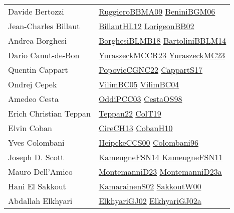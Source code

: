 {\begin{longtable}{p{4cm}p{20cm}}
Davide Bertozzi & \href{articles/RuggieroBBMA09.pdf}{RuggieroBBMA09}\cite{RuggieroBBMA09} \href{papers/BeniniBGM06.pdf}{BeniniBGM06}\cite{BeniniBGM06} \\
Jean{-}Charles Billaut & \href{papers/BillautHL12.pdf}{BillautHL12}\cite{BillautHL12} \href{}{LorigeonBB02}\cite{LorigeonBB02} \\
Andrea Borghesi & \href{articles/BorghesiBLMB18.pdf}{BorghesiBLMB18}\cite{BorghesiBLMB18} \href{papers/BartoliniBBLM14.pdf}{BartoliniBBLM14}\cite{BartoliniBBLM14} \\
Dario Canut{-}de{-}Bon & \href{articles/YuraszeckMCCR23.pdf}{YuraszeckMCCR23}\cite{YuraszeckMCCR23} \href{papers/YuraszeckMC23.pdf}{YuraszeckMC23}\cite{YuraszeckMC23} \\
Quentin Cappart & \href{papers/PopovicCGNC22.pdf}{PopovicCGNC22}\cite{PopovicCGNC22} \href{papers/CappartS17.pdf}{CappartS17}\cite{CappartS17} \\
Ondrej Cepek & \href{articles/VilimBC05.pdf}{VilimBC05}\cite{VilimBC05} \href{papers/VilimBC04.pdf}{VilimBC04}\cite{VilimBC04} \\
Amedeo Cesta & \href{papers/OddiPCC03.pdf}{OddiPCC03}\cite{OddiPCC03} \href{papers/CestaOS98.pdf}{CestaOS98}\cite{CestaOS98} \\
Erich Christian Teppan & \href{papers/Teppan22.pdf}{Teppan22}\cite{Teppan22} \href{papers/ColT19.pdf}{ColT19}\cite{ColT19} \\
Elvin Coban & \href{papers/CireCH13.pdf}{CireCH13}\cite{CireCH13} \href{papers/CobanH10.pdf}{CobanH10}\cite{CobanH10} \\
Yves Colombani & \href{articles/HeipckeCCS00.pdf}{HeipckeCCS00}\cite{HeipckeCCS00} \href{papers/Colombani96.pdf}{Colombani96}\cite{Colombani96} \\
Joseph D. Scott & \href{articles/KameugneFSN14.pdf}{KameugneFSN14}\cite{KameugneFSN14} \href{papers/KameugneFSN11.pdf}{KameugneFSN11}\cite{KameugneFSN11} \\
Mauro Dell'Amico & \href{articles/MontemanniD23.pdf}{MontemanniD23}\cite{MontemanniD23} \href{articles/MontemanniD23a.pdf}{MontemanniD23a}\cite{MontemanniD23a} \\
Hani El Sakkout & \href{papers/KamarainenS02.pdf}{KamarainenS02}\cite{KamarainenS02} \href{articles/SakkoutW00.pdf}{SakkoutW00}\cite{SakkoutW00} \\
Abdallah Elkhyari & \href{papers/ElkhyariGJ02.pdf}{ElkhyariGJ02}\cite{ElkhyariGJ02} \href{papers/ElkhyariGJ02a.pdf}{ElkhyariGJ02a}\cite{ElkhyariGJ02a} \\

\end{longtable}}
